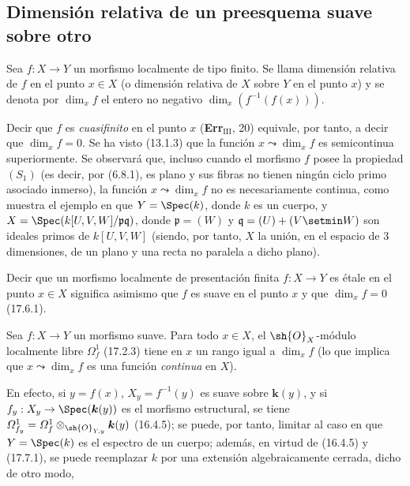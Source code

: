 \subsection{Dimensión relativa de un preesquema suave sobre otro}
\label{subsection:IV.17.10}

\begin{definition}[17.10.1]
\label{IV.17.10.1}
Sea $f:X\to Y$ un morfismo localmente de tipo finito. Se llama dimensión relativa de $f$ en el punto $x\in X$ (o dimensión relativa de $X$ sobre $Y$ en el punto $x$) y se denota por $\dim_x f$ el entero no negativo $\dim_x(f^{-1}(f(x)))$.
\end{definition}

Decir que $f$ es \emph{cuasifinito} en el punto $x$ (\textbf{Err}$_{\mathrm{III}}$, 20) equivale, por tanto, a decir que $\dim_x f=0$. Se ha visto (13.1.3) que la función $x\leadsto\dim_x f$ es semicontinua superiormente. Se observará que, incluso cuando el morfismo $f$ posee la propiedad $(S_1)$ (es decir, por (6.8.1), es plano y sus fibras no tienen ningún ciclo primo asociado inmerso), la función $x\leadsto\dim_x f$ no es necesariamente continua, como muestra el ejemplo en que $Y=\Spec(k)$, donde $k$ es un cuerpo, y $X=\Spec(k[U,V,W]/\mathfrak p\mathfrak q)$, donde $\mathfrak p=(W)$ y $\mathfrak q=(U)+(V\setmin W)$ son ideales primos de $k[U,V,W]$ (siendo, por tanto, $X$ la unión, en el espacio de 3 dimensiones, de un plano y una recta no paralela a dicho plano).

Decir que un morfismo localmente de presentación finita $f:X\to Y$ es étale en el punto $x\in X$ significa asimismo que $f$ es suave en el punto $x$ y que $\dim_x f=0$ (17.6.1).

\begin{proposition}[17.10.2]
\label{IV.17.10.2}
Sea $f:X\to Y$ un morfismo suave. Para todo $x\in X$, el $\sh{O}_X$-módulo localmente libre $\varOmega_f^1$ \textup{(17.2.3)} tiene en $x$ un rango igual a $\dim_x f$ \textup{(lo que implica que $x\leadsto\dim_x f$ es una función \emph{continua} en $X$)}.
\end{proposition}

En efecto, si $y=f(x)$, $X_y=f^{-1}(y)$ es suave sobre $\boldsymbol{k}(y)$, y si $f_y:X_y\to\Spec(\boldsymbol{k}(y))$ es el morfismo estructural, se tiene $\varOmega_{f_y}^1=\varOmega_f^1\otimes_{\sh{O}_{Y,y}}\boldsymbol{k}(y)$ (16.4.5); se puede, por tanto, limitar al caso en que $Y=\Spec(k)$ es el espectro de un cuerpo; además, en virtud de (16.4.5) y (17.7.1), se puede reemplazar $k$ por una extensión algebraicamente cerrada, dicho de otro modo,

